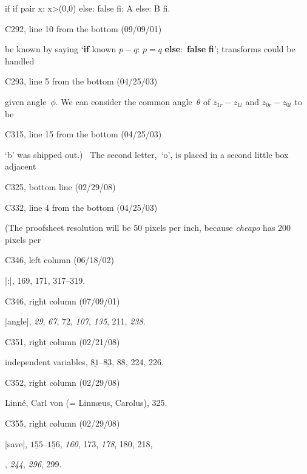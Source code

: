 {{\vskip-6pt\ninepoint\begintt
if if pair x: x>(0,0) else: false fi: A else: B fi.
\endtt

\bugonpage C292, line 10 from the bottom (09/09/01)

\ninepoint\noindent
be known by saying `{\bf if\/} known $p-q$: $p=q$ {\bf else}:~{\bf false}
{\bf fi}'; transforms could be handled\cutpar

\bugonpage C293, line 5 from the bottom (04/25/03)

\ninepoint\noindent
given angle~$\phi$. We can consider
the common angle~$\theta$ of $z_{1r}-z_{1l}$ and $z_{0r}-z_{0l}$ to be\cutpar

\bugonpage C315, line 15 from the bottom (04/25/03)

\ninepoint\noindent
`b' was shipped out.) \ The second letter,~`o', is placed
in a second little box adjacent\cutpar

\bugonpage C325, bottom line (02/29/08)


\bugonpage C332, line 4 from the bottom (04/25/03)

\ninepoint\noindent
(The proofsheet resolution will be 50 pixels per inch, because {\it cheapo\/}
has 200 pixels per\cutpar

\bugonpage C346, left column (06/18/02)

\eightpoint\noindent
\llap{*}|:|, 169, 171, 317--319.

\bugonpage C346, right column (07/09/01)

\eightpoint\noindent
\llap{*}|angle|, {\it29}, {\it67}, $\underline{72}$, {\it107},
{\it135}, 211, {\it238}.

\bugonpage C351, right column (02/21/08)

\eightpoint\noindent
independent variables, $\underline{81}$--$\underline{83}$, 88, 224, 226.

\bugonpage C352, right column (02/29/08)

\eightpoint\noindent
Linn\'e, Carl von (= Linn\ae us, Carolus), 325.

\bugonpage C355, right column (02/29/08)

\eightpoint\noindent
\llap{*}|save|, $\underline{155}$--$\underline{156}$, {\it160}, 173,
  {\it178}, 180, 218,\par
\noindent{}, {\it244}, {\it296}, 299.

\def\\#1{\hbox{\it#1\/\kern.05em}} %
\def\to{\mathrel{.\,.}} %

}}

